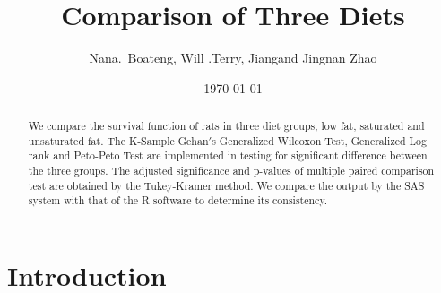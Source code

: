 \documentclass[11pt]{article}
\title{ Comparison of Three Diets}
\author{Nana.~Boateng\footnotemark[1], Will .Terry\footnotemark[2], Jiang\footnotemark[3] and Jingnan
Zhao\footnotemark[7]}
\date{\today}
\numberwithin{figure}{section}
\begin{document}
\maketitle \thispagestyle{empty}
\begin{abstract}

We compare the survival function of rats in three diet groups, low fat, saturated and unsaturated fat. The K-Sample Gehan$'$s Generalized Wilcoxon Test, Generalized Log rank and Peto-Peto Test are   implemented in testing for significant difference between the three groups. The adjusted significance and p-values of multiple paired comparison test are obtained by the Tukey-Kramer method. We compare the output by the SAS system with that of the R software to determine   its consistency.

\end{abstract}



\section{Introduction}

\end{document}
